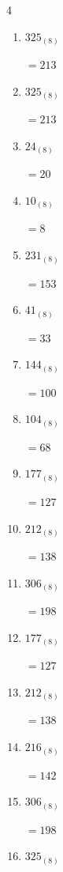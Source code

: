 \begin{multicols}{4}
\begin{enumerate}
        $=13$

  \item $325_{(8)}$

        $=213$

\columnbreak %

\resetques

  \item $325_{(8)}$

        $=213$

  \item $24_{(8)}$

        $=20$

  \item $10_{(8)}$

        $=8$

  \item $231_{(8)}$

        $=153$

  \item $41_{(8)}$

        $=33$

  \item $144_{(8)}$

        $=100$

  \item $104_{(8)}$

        $=68$

  \item $177_{(8)}$

        $=127$

  \item $212_{(8)}$

        $=138$

  \item $306_{(8)}$

        $=198$

  \item $177_{(8)}$

        $=127$

  \item $212_{(8)}$

        $=138$

  \item $216_{(8)}$

        $=142$

  \item $306_{(8)}$

        $=198$

  \item $325_{(8)}$


\end{enumerate}
\end{multicols}
